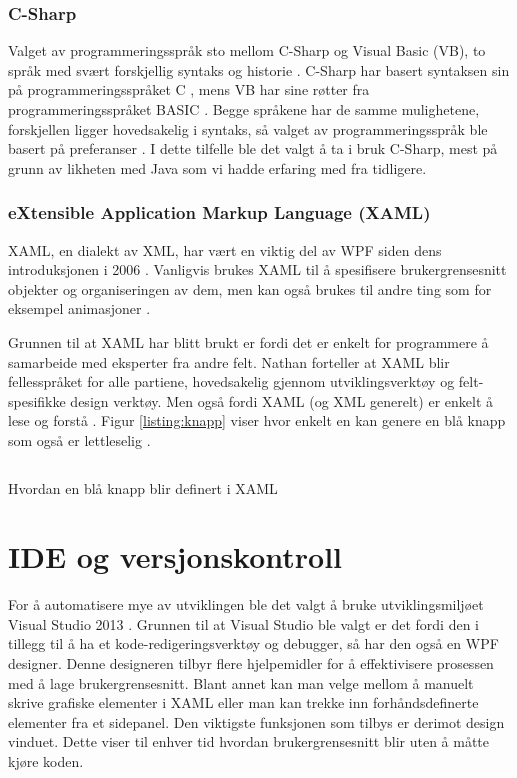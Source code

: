 \subsubsection{C-Sharp} 

Valget av programmeringsspråk sto mellom C-Sharp og Visual Basic (VB), to språk med svært forskjellig syntaks og historie \cite{Compa6:online}. C-Sharp har basert syntaksen sin på programmeringsspråket C , mens VB har sine røtter fra programmeringsspråket BASIC \cite{Visua3:online} \cite{About8:online}. Begge språkene har de samme mulighetene, forskjellen ligger hovedsakelig i syntaks, så valget av programmeringsspråk ble basert på preferanser \cite{What0:online}. I dette tilfelle ble det valgt å ta i bruk C-Sharp, mest på grunn av likheten med Java som vi hadde erfaring med fra tidligere.


\subsubsection{eXtensible Application Markup Language (XAML)} 

XAML, en dialekt av XML, har vært en viktig del av WPF siden dens introduksjonen i 2006 \cite[p.~17]{WPFbook}. Vanligvis brukes XAML til å spesifisere brukergrensesnitt objekter og organiseringen av dem, men kan også brukes til andre ting som for eksempel animasjoner \cite{Story5:online}. 

Grunnen til at XAML har blitt brukt er fordi det er enkelt for programmere å samarbeide med eksperter fra andre felt. Nathan forteller at XAML blir fellesspråket for alle partiene, hovedsakelig gjennom utviklingsverktøy og felt-spesifikke design verktøy. Men også fordi XAML (og XML generelt) er enkelt å lese og forstå \cite[p.~17]{WPFbook}. Figur \ref{listing:knapp} viser hvor enkelt en kan genere en blå knapp som også er lettleselig .


\begin{listing}[ht] 
\inputminted[fontsize=\footnotesize, frame=lines,framesep=2mm,baselinestretch=1.2,bgcolor=lightgray,linenos]{xml}{Code/xamlexample.xml} 
\caption{Hvordan en blå knapp blir definert i XAML} 
\label{listing:knapp} 
\end{listing} 
 
   
\section{IDE og versjonskontroll} 

For å automatisere mye av utviklingen ble det valgt å bruke utviklingsmiljøet Visual Studio 2013 \cite{2013-1:online}. Grunnen til at Visual Studio ble valgt er det fordi den i tillegg til å ha et kode-redigeringsverktøy og debugger, så har den også en WPF designer\cite{What8:online}. Denne designeren tilbyr flere hjelpemidler for å effektivisere prosessen med å lage brukergrensesnitt. Blant annet kan man velge mellom å manuelt skrive grafiske elementer i XAML eller man kan trekke inn forhåndsdefinerte elementer fra et sidepanel. Den viktigste funksjonen som tilbys er derimot design vinduet. Dette viser til enhver tid hvordan brukergrensesnitt blir uten å måtte kjøre koden\cite{WPF D1:online}. 
 

